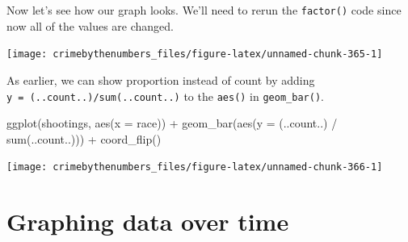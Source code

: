 \documentclass[
  a4paper,
]{krantz}
\makeatletter
\newenvironment{Shaded}{\begin{snugshade}}{\end{snugshade}}
\newcommand{\AttributeTok}[1]{\textcolor[rgb]{0.61,0.61,0.61}{#1}}
\newcommand{\ConstantTok}[1]{\textcolor[rgb]{0,0,0}{#1}}
\newcommand{\FunctionTok}[1]{\textcolor[rgb]{0,0,0}{#1}}
\newcommand{\NormalTok}[1]{#1}
\newcommand{\OtherTok}[1]{\textcolor[rgb]{0.37,0.37,0.37}{#1}}
\newcommand{\SpecialCharTok}[1]{\textcolor[rgb]{0,0,0}{#1}}
\newenvironment{kframe}{%
\medskip{}
\setlength{\fboxsep}{.8em}
 \def\at@end@of@kframe{}%
 \ifinner\ifhmode%
  \def\at@end@of@kframe{\end{minipage}}%
  \begin{minipage}{\columnwidth}%
 \fi\fi%
 \def\FrameCommand##1{\hskip\@totalleftmargin \hskip-\fboxsep
 \colorbox{shadecolor}{##1}\hskip-\fboxsep
     \hskip-\linewidth \hskip-\@totalleftmargin \hskip\columnwidth}%
 \MakeFramed {\advance\hsize-\width
   \@totalleftmargin\z@ \linewidth\hsize
   \@setminipage}}%
 {\par\unskip\endMakeFramed%
 \at@end@of@kframe}
\renewenvironment{Shaded}{\begin{kframe}}{\end{kframe}}
\makeatother
\begin{document}
Now let's see how our graph looks. We'll need to rerun the
\texttt{factor()} code since now all of the values are
changed.

\begin{Shaded}
\end{Shaded}

\begin{center}\texttt{[image: crimebythenumbers\_files/figure-latex/unnamed-chunk-365-1]} \end{center}

As earlier, we can show proportion instead of count by
adding \texttt{y\ =\ (..count..)/sum(..count..)} to the
\texttt{aes()} in \texttt{geom\_bar()}.

\begin{Shaded}
\begin{Highlighting}[]
\FunctionTok{ggplot}\NormalTok{(shootings, }\FunctionTok{aes}\NormalTok{(}\AttributeTok{x =}\NormalTok{ race)) }\SpecialCharTok{+}
  \FunctionTok{geom\_bar}\NormalTok{(}\FunctionTok{aes}\NormalTok{(}\AttributeTok{y =}\NormalTok{ (..count..) }\SpecialCharTok{/} \FunctionTok{sum}\NormalTok{(..count..))) }\SpecialCharTok{+}
  \FunctionTok{coord\_flip}\NormalTok{()}
\end{Highlighting}
\end{Shaded}

\begin{center}\texttt{[image: crimebythenumbers\_files/figure-latex/unnamed-chunk-366-1]} \end{center}

\hypertarget{graphing-data-over-time}{%
\section{Graphing data over
time}\label{graphing-data-over-time}}
\end{document}
